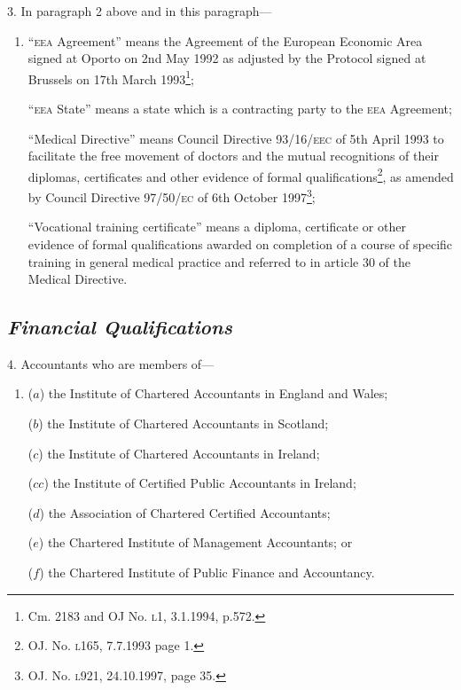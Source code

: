 \documentclass[12pt,a4paper]{article}
\begin{document}
3.  In paragraph 2 above and in this paragraph—
\begin{enumerate}\item[]
“\textsc{\lowercase{EEA}} Agreement” means the Agreement of the European Economic Area signed at Oporto on 2nd May 1992 as adjusted by the Protocol signed at Brussels on 17th March 1993\footnote{\frenchspacing Cm. 2183 and OJ No. \textsc{\lowercase{L1}}, 3.1.1994, p.572.};

“\textsc{\lowercase{EEA}} State” means a state which is a contracting party to the \textsc{\lowercase{EEA}} Agreement;

\enlargethispage{\baselineskip}

“Medical Directive” means Council Directive 93/16/\textsc{\lowercase{EEC}} of 5th April 1993 to facilitate the free movement of doctors and the mutual recognitions of their diplomas, certificates and other evidence of formal qualifications\footnote{\frenchspacing OJ. No. \textsc{\lowercase{L165}}, 7.7.1993 page 1.}, as amended by Council Directive 97/50/\textsc{\lowercase{EC}} of 6th October 1997\footnote{\frenchspacing OJ. No. \textsc{\lowercase{L921}}, 24.10.1997, page 35.};

“Vocational training certificate” means a diploma, certificate or other evidence of formal qualifications awarded on completion of a course of specific training in general medical practice and referred to in article 30 of the Medical Directive.
\end{enumerate}

\subsection*{\itshape Financial Qualifications}

4.  Accountants who are members of—
\begin{enumerate}\item[]
($a$) the Institute of Chartered Accountants in England and Wales;

($b$) the Institute of Chartered Accountants in Scotland;

($c$) the Institute of Chartered Accountants in Ireland;

($cc$) the Institute of Certified Public Accountants in Ireland;

($d$) the Association of Chartered Certified Accountants;

($e$) the Chartered Institute of Management Accountants; or

($f$) the Chartered Institute of Public Finance and Accountancy.
\end{enumerate}
\end{document}
